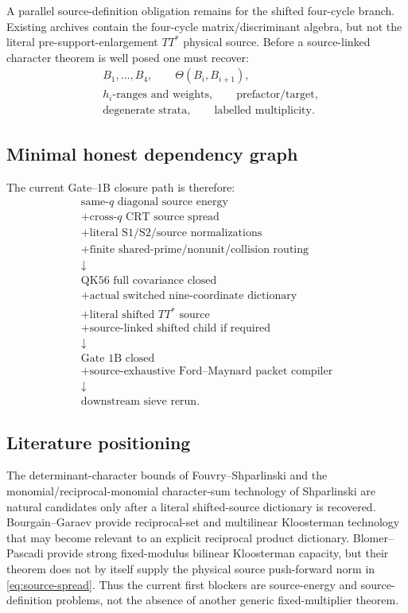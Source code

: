 \documentclass[11pt]{article}
\theoremstyle{definition}
\newcommand{\1}{\mathbf 1}
\begin{document}
A parallel source-definition obligation remains for the shifted four-cycle
branch.  Existing archives contain the four-cycle matrix/discriminant
algebra, but not the literal pre-support-enlargement $TT^\ast$ physical
source.  Before a source-linked character theorem is well posed one must
recover:
\[
\begin{aligned}
 &B_1,\ldots,B_4,\qquad \Theta(B_i,B_{i+1}),\\
 &h_i\text{-ranges and weights},\qquad \text{prefactor/target},\\
 &\text{degenerate strata},\qquad \text{labelled multiplicity}.
\end{aligned}
\]

\subsection{Minimal honest dependency graph}

The current Gate--1B closure path is therefore:
\[
\begin{array}{c}
\text{same-}q\text{ diagonal source energy}\\
+\text{cross-}q\text{ CRT source spread}\\
+\text{literal S1/S2/source normalizations}\\
+\text{finite shared-prime/nonunit/collision routing}\\[1mm]
\downarrow\\
\text{QK56 full covariance closed}\\[2mm]
+\text{actual switched nine-coordinate dictionary}\\
+\text{literal shifted }TT^\ast\text{ source}\\
+\text{source-linked shifted child if required}\\[1mm]
\downarrow\\
\text{Gate 1B closed}\\[2mm]
+\text{source-exhaustive Ford--Maynard packet compiler}\\
\downarrow\\
\text{downstream sieve rerun.}
\end{array}
\]

\subsection{Literature positioning}

The determinant-character bounds of Fouvry--Shparlinski \cite{FouvryShparlinski2022} and the
monomial/reciprocal-monomial character-sum technology of Shparlinski
\cite{Shparlinski2013} are natural candidates only after a literal shifted-source dictionary is
recovered.  Bourgain--Garaev \cite{BourgainGaraev2012} provide reciprocal-set and multilinear
Kloosterman technology that may become relevant to an explicit reciprocal
product dictionary.  Blomer--Pascadi \cite{BlomerPascadi2026} provide strong fixed-modulus bilinear
Kloosterman capacity, but their theorem does not by itself supply the
physical source push-forward norm in \eqref{eq:source-spread}.  Thus the
current first blockers are source-energy and source-definition problems,
not the absence of another generic fixed-multiplier theorem.
\end{document}

